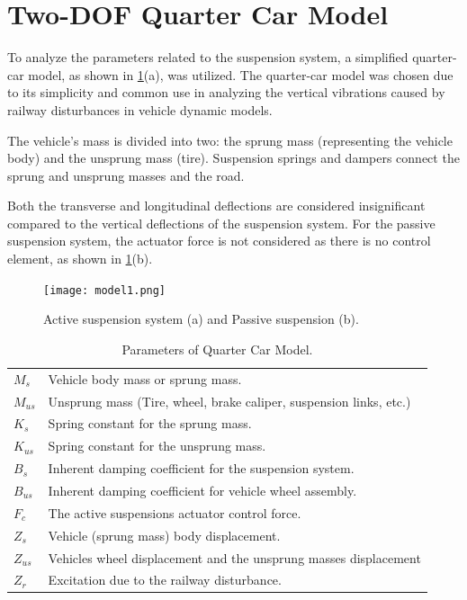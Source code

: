 \section{Two-DOF Quarter Car Model}
To analyze the parameters related to the suspension system, a simplified quarter-car model, as shown in \ref{fig:m1}(a), was utilized. The quarter-car model was chosen due to its simplicity and common use in analyzing the vertical vibrations caused by railway disturbances in vehicle dynamic models.

The vehicle's mass is divided into two: the sprung mass (representing the vehicle body) and the unsprung mass (tire). Suspension springs and dampers connect the sprung and unsprung masses and the road.

Both the transverse and longitudinal deflections are considered insignificant compared to the vertical deflections of the suspension system. For the passive suspension system, the actuator force is not considered as there is no control element, as shown in \ref{fig:m1}(b).

\begin{figure}[H]
	\centering
	\texttt{[image: model1.png]}
	\caption{Active suspension system (a) and Passive suspension (b).}
	\label{fig:m1}\cite{lqr_acti}
\end{figure}

\begin{table}[H]
	\centering
	\caption{Parameters of Quarter Car Model.}
	\begin{tabular}{l|l}
		\hline
		$M_s$ & Vehicle body mass or sprung mass. \\
		$M_{us}$ & Unsprung mass (Tire, wheel, brake caliper, suspension links, etc.) \\
		$K_s$ & Spring constant for the sprung mass. \\
		$K_{us}$ & Spring constant for the unsprung mass. \\
		$B_s$ & Inherent damping coefficient for the suspension system. \\
		$B_{us}$ & Inherent damping coefficient for vehicle wheel assembly. \\
		$F_c$ & The active suspensions actuator control force. \\
		$Z_s$ & Vehicle (sprung mass) body displacement. \\
		$Z_{us}$ & Vehicles wheel displacement and the unsprung masses displacement \\
		$Z_r$ & Excitation due to the railway disturbance. \\
		\hline
	\end{tabular}
	\label{table:qcm_image}
\end{table}

